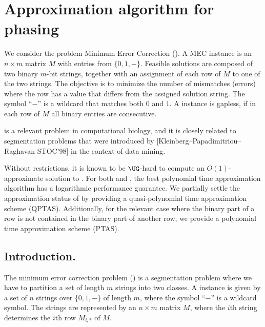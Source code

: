 \chapter{Approximation algorithm for phasing}



    We consider the problem Minimum Error Correction (\MEC).
    A MEC instance is an $n \times m$ matrix $M$ with entries from $\{0,1,-\}$. 
    Feasible solutions are composed of two binary $m$-bit strings, together with an assignment of each row of $M$ to one of the two strings.
    The objective is to minimize the number of mismatches (errors) where the row has a value that differs from the assigned solution string.
    The symbol ``$-$'' is a wildcard that matches both $0$ and $1$.
    A \MEC instance is gapless, if in each row of $M$ all binary entries are consecutive.

    \GMEC is a relevant problem in computational biology, and it is closely related to segmentation problems that were introduced by {[}Kleinberg--Papadimitriou--Raghavan STOC'98{]} in the context of data mining.

    Without restrictions, it is known to be $\UG$-hard to compute an $O(1)$-approximate solution to \MEC. For both \MEC and \GMEC, the best polynomial time approximation algorithm has a logarithmic performance guarantee.
    We partially settle the approximation status of \GMEC by providing a quasi-polynomial time approximation scheme (QPTAS).
    Additionally, for the relevant case where the binary part of a row is not contained in the binary part of another row, we provide a polynomial time approximation scheme (PTAS).
\thispagestyle{empty}

\newpage{}

\setcounter{page}{1}

\section{Introduction.}
The minimum error correction problem (\MEC) is a segmentation problem where we have to partition a set of length $m$ strings into two classes.
A \MEC instance is given by a set of $n$ strings over $\{0,1,-\}$ of length $m$, where the symbol ``$-$'' is a wildcard symbol.
The strings are represented by an $n \times m$ matrix $M$, where the $i$th string determines the $i$th row $M_{i,*}$ of $M$.

